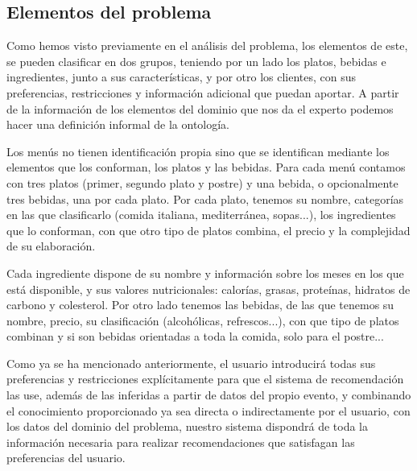 \documentclass{article}
\begin{document}
\subsection{Elementos del problema}
Como hemos visto previamente en el análisis del problema, los elementos de este, se pueden clasificar en dos grupos, teniendo por un lado los platos, bebidas e ingredientes, junto a sus características, y por otro los clientes, con sus preferencias, restricciones y información adicional que puedan aportar. A partir de la información de los elementos del dominio que nos da el experto podemos hacer una definición informal de la ontología.
\par
Los menús no tienen identificación propia sino que se identifican mediante los elementos que los conforman, los platos y las bebidas. Para cada menú contamos con tres platos (primer, segundo plato y postre) y una bebida, o opcionalmente tres bebidas, una por cada plato. Por cada plato, tenemos su nombre, categorías en las que clasificarlo (comida italiana, mediterránea, sopas...), los ingredientes que lo conforman, con que otro tipo de platos combina, el precio y la complejidad de su elaboración.
\par
Cada ingrediente dispone de su nombre y información sobre los meses en los que está disponible, y sus valores nutricionales: calorías, grasas, proteínas, hidratos de carbono y colesterol. Por otro lado tenemos las bebidas, de las que tenemos su nombre, precio, su clasificación (alcohólicas, refrescos...), con que tipo de platos combinan y si son bebidas orientadas a toda la comida, solo para el postre...
\par
Como ya se ha mencionado anteriormente, el usuario introducirá todas sus preferencias y restricciones explícitamente para que el sistema de recomendación las use, además de las inferidas a partir de datos del propio evento, y combinando el conocimiento proporcionado ya sea directa o indirectamente por el usuario, con los datos del dominio del problema, nuestro sistema dispondrá de toda la información necesaria para realizar recomendaciones que satisfagan las preferencias del usuario.
\end{document}
